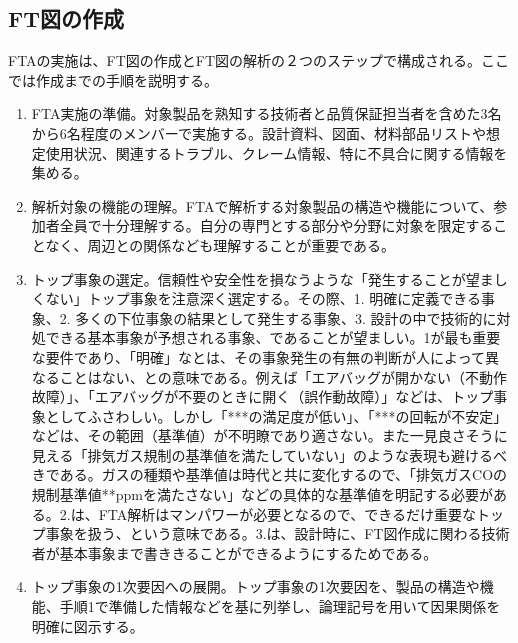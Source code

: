 \subsection{FT図の作成}
FTAの実施は、FT図の作成とFT図の解析の２つのステップで構成される。ここでは作成までの手順を説明する。
\begin{enumerate}
\item FTA実施の準備。対象製品を熟知する技術者と品質保証担当者を含めた3名から6名程度のメンバーで実施する。設計資料、図面、材料部品リストや想定使用状況、関連するトラブル、クレーム情報、特に不具合に関する情報を集める。
\item 解析対象の機能の理解。FTAで解析する対象製品の構造や機能について、参加者全員で十分理解する。自分の専門とする部分や分野に対象を限定することなく、周辺との関係なども理解することが重要である。
\item トップ事象の選定。信頼性や安全性を損なうような「発生することが望ましくない」トップ事象を注意深く選定する。その際、1. 明確に定義できる事象、2. 多くの下位事象の結果として発生する事象、3. 設計の中で技術的に対処できる基本事象が予想される事象、であることが望ましい。1が最も重要な要件であり、「明確」なとは、その事象発生の有無の判断が人によって異なることはない、との意味である。例えば「エアバッグが開かない（不動作故障）」、「エアバッグが不要のときに開く（誤作動故障）」などは、トップ事象としてふさわしい。しかし「***の満足度が低い」、「***の回転が不安定」などは、その範囲（基準値）が不明瞭であり適さない。また一見良さそうに見える「排気ガス規制の基準値を満たしていない」のような表現も避けるべきである。ガスの種類や基準値は時代と共に変化するので、「排気ガスCOの規制基準値**ppmを満たさない」などの具体的な基準値を明記する必要がある。2.は、FTA解析はマンパワーが必要となるので、できるだけ重要なトップ事象を扱う、という意味である。3.は、設計時に、FT図作成に関わる技術者が基本事象まで書ききることができるようにするためである。
\item トップ事象の1次要因への展開。トップ事象の1次要因を、製品の構造や機能、手順1で準備した情報などを基に列挙し、論理記号を用いて因果関係を明確に図示する。


\end{enumerate}
